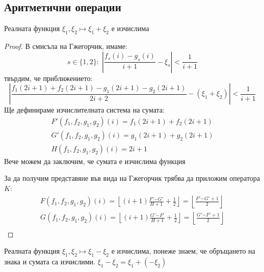 \subsection{Аритметични операции}
\begin{proposition}[Събиране]
    Реалната функция $\xi_1, \xi_2 \mapsto \xi_1 + \xi_2$ е изчислима
\end{proposition}
\begin{proof}
    В смисъла на Гжегорчик, имаме:
    \begin{equation}
        s \in \{1, 2\}:\; \left|\frac{f_s(i) - g_s(i)}{i+1} - \xi_s \right| < \frac{1}{i+1}
    \end{equation}
    твърдим, че приближението:
    \begin{equation}
        \left|\frac{f_1(2i+1) + f_2(2i+1) - g_1(2i+1) - g_2(2i+1)}{2i+2} - (\xi_1+\xi_2) \right| < \frac{1}{i+1}
    \end{equation}
    Ще дефинираме изчислителната система на сумата:
    \begin{equation}
        \begin{split}
            F'(f_1, f_2, g_1, g_2)(i) = f_1(2i+1) + f_2(2i+1) \\
            G'(f_1, f_2, g_1, g_2)(i) = g_1(2i+1) + g_2(2i+1) \\
            H(f_1, f_2, g_1, g_2)(i) = 2i+1
        \end{split}
    \end{equation}
    Вече можем да заключим, че сумата е изчислима функция
    
    За да получим представяне във вида на Гжегорчик трябва да приложим оператора $K$:
    \begin{equation}
        \begin{split}
            F(f_1, f_2, g_1, g_2)(i) = \left\lfloor (i+1)\frac{F' \dot{-} G'}{H+1} + \frac{1}{2} \right\rfloor = \left\lfloor \frac{F' \dot{-} G' + 1}{2}\right\rfloor \\
            G(f_1, f_2, g_1, g_2)(i) = \left\lfloor (i+1)\frac{G' \dot{-} F'}{H+1} + \frac{1}{2} \right\rfloor = \left\lfloor \frac{G' \dot{-} F' + 1}{2}\right\rfloor  \\
        \end{split}
    \end{equation}
\end{proof}
\begin{corollary}
    Реалната функция $\xi_1, \xi_2 \mapsto \xi_1 - \xi_2$ е изчислима, понеже знаем, че обръщането на знака и сумата са изчислими. $\xi_1 - \xi_2 = \xi_1 + (-\xi_2)$
\end{corollary}


